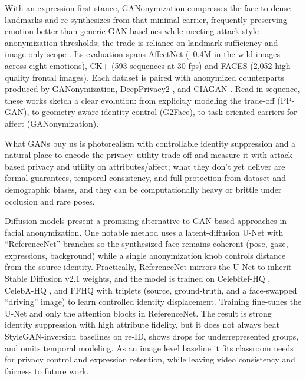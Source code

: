 \documentclass[12pt]{article}
\begin{document}
With an expression-first stance, GANonymization compresses the face to dense landmarks and re-synthesizes from that minimal carrier, frequently preserving emotion better than generic GAN baselines while meeting attack-style anonymization thresholds; the trade is reliance on landmark sufficiency and image-only scope \cite{hellmann}. Its evaluation spans AffectNet \cite{affectnet} (~0.4M in-the-wild images across eight emotions), CK+ \cite{ck+} (593 sequences at 30 fps) and FACES \cite{faces} (2,052 high-quality frontal images). Each dataset is paired with anonymized counterparts produced by GANonymization, DeepPrivacy2 \cite{deeprivacy2}, and CIAGAN \cite{ciagan}. Read in sequence, these works sketch a clear evolution: from explicitly modeling the trade-off (PP-GAN), to geometry-aware identity control (G2Face), to task-oriented carriers for affect (GANonymization).

What GANs buy us is photorealism with controllable identity suppression and a natural place to encode the privacy–utility trade-off and measure it with attack-based privacy and utility on attributes/affect; what they don’t yet deliver are formal guarantees, temporal consistency, and full protection from dataset and demographic biases, and they can be computationally heavy or brittle under occlusion and rare poses.

Diffusion models present a promising alternative to GAN-based approaches in facial anonymization. One notable method \cite{kung} uses a latent-diffusion U-Net with “ReferenceNet” branches so the synthesized face remains coherent (pose, gaze, expressions, background) while a single anonymization knob controls distance from the source identity. Practically, ReferenceNet mirrors the U-Net to inherit Stable Diffusion v2.1 weights, and the model is trained on CelebRef-HQ \cite{celebv}, CelebA-HQ \cite{celebahq}, and FFHQ \cite{ffhq} with triplets (source, ground-truth, and a face-swapped “driving” image) to learn controlled identity displacement. Training fine-tunes the U-Net and only the attention blocks in ReferenceNet. The result is strong identity suppression with high attribute fidelity, but it does not always beat StyleGAN-inversion baselines on re-ID, shows drops for underrepresented groups, and omits temporal modeling. As an image level baseline it fits classroom needs for privacy control and expression retention, while leaving video consistency and fairness to future work.
\end{document}
